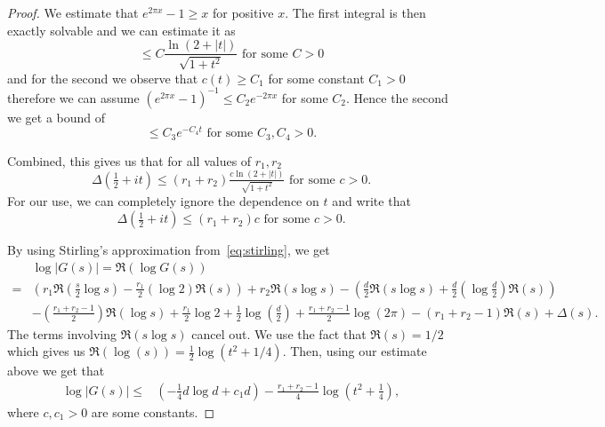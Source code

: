 \documentclass[10pt,a4paper]{amsart}
\begin{document}
\begin{proof}
We estimate that $e^{2\pi x} - 1 \geq x$ for positive $x$. The first integral is then exactly solvable and we can estimate it as 
\begin{equation}
    \leq C \frac{ \ln( 2 + |t|)}{\sqrt{1+t^{2}}} \text{ for some }  C>0
\end{equation}
 and for the second we observe that $c(t) \geq C_1$ for some constant $C_{1} > 0$ therefore we can assume $(e^{2\pi x} - 1)^{-1} \leq C_{2} e^{-2 \pi x}$ for some $C_2$. Hence the second we get a bound of
\begin{equation}
    \leq C_{3} e^{-C_{4} t} \text{  for some  } C_{3},C_{4} > 0.
\end{equation}

Combined, this gives us that for all values of $r_{1},r_{2}$
\begin{equation}
    \Delta(\tfrac{1}{2}+it) \leq  (r_{1}+r_{2}) \tfrac{c \ln(2 + |t|)}{\sqrt{1+t^{2}}} \text{ for some } c>0.
\end{equation}
For our use, we can completely ignore the dependence on $t$ and write that 
\begin{equation}
    \Delta(\tfrac{1}{2}+it) \leq  (r_{1}+r_{2}) {c}\text{ for some } c>0.
\end{equation}


By using Stirling's approximation from~\cref{eq:stirling}, we get 
\begin{align}
    & \log |G(s)| 
    =  \Re( \log G(s)) \\
    = & \left( r_{1} \Re(\tfrac{s}{2} \log {s}) -   \tfrac{r_{1}}{2}(\log 2)\Re({s} )  \right) 
    + r_{2} \Re (s \log s) 
    - \left(\tfrac{d}{2} \Re(s \log s) + \tfrac{d}{2} (\log \tfrac{d}{2})\Re(s )  \right) \\ 
      & - \left(\tfrac{r_{1}+r_{2}-1}{2}\right) \Re(\log s) 
      + \tfrac{r_{1}}{2} \log 2 +  \tfrac{1}{2}\log (\tfrac{d}{2})  + \tfrac{r_{1}+r_{2} - 1 }{2} \log (2 \pi) 
      -(r_{1}+r_{2}-1)\Re(s)
 +
      \Delta(s) .
\end{align}
The terms involving $\Re(s \log s)$ cancel out.
We use the fact that $\Re(s) = 1/2$ which gives us $\Re(\log (s)) = \tfrac{1}{2}\log (t^{2} + 1/4)$. 
Then, using our estimate above
we get that 
\begin{align}
     \log |G(s)|  
     \leq &   
     \left( -\tfrac{1}{4} d \log d + c_{1} d \right)  - \tfrac{r_{1}+r_{2}-1}{4}\log\left( t^{2} + \tfrac{1}{4}\right),
\end{align}
where $c,c_{1} > 0$ are some constants.
\end{proof}
\end{document}
